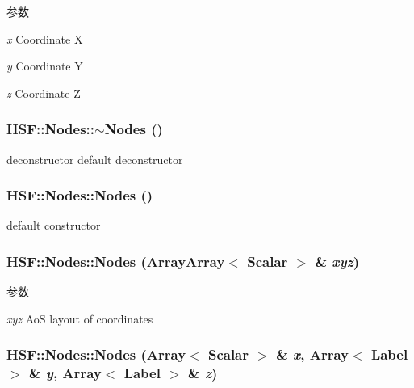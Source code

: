 \begin{DoxyParams}{参数}
\item[{\em x}]Coordinate X \item[{\em y}]Coordinate Y \item[{\em z}]Coordinate Z \end{DoxyParams}
\hypertarget{classHSF_1_1Nodes_aad6cecbfe88532697dedfca221638d89}{
\subsubsection[{$\sim$Nodes}]{\setlength{\rightskip}{0pt plus 5cm}HSF::Nodes::$\sim$Nodes ()}}
\label{classHSF_1_1Nodes_aad6cecbfe88532697dedfca221638d89}


deconstructor default deconstructor \hypertarget{classHSF_1_1Nodes_a4cf0a36ef0cbd1d2183e6f426289b3ef}{
\subsubsection[{Nodes}]{\setlength{\rightskip}{0pt plus 5cm}HSF::Nodes::Nodes ()}}
\label{classHSF_1_1Nodes_a4cf0a36ef0cbd1d2183e6f426289b3ef}


default constructor \hypertarget{classHSF_1_1Nodes_a6c4e1453888f5fa3008d992d1f19c1b4}{
\subsubsection[{Nodes}]{\setlength{\rightskip}{0pt plus 5cm}HSF::Nodes::Nodes ({\bf ArrayArray}$<$ {\bf Scalar} $>$ \& {\em xyz})}}
\label{classHSF_1_1Nodes_a6c4e1453888f5fa3008d992d1f19c1b4}

\begin{DoxyParams}{参数}
\item[{\em xyz}]AoS layout of coordinates \end{DoxyParams}
\hypertarget{classHSF_1_1Nodes_aa08a28dcddd6fdbc64fef3d3c7bfba82}{
\subsubsection[{Nodes}]{\setlength{\rightskip}{0pt plus 5cm}HSF::Nodes::Nodes (Array$<$ {\bf Scalar} $>$ \& {\em x}, \/  Array$<$ {\bf Label} $>$ \& {\em y}, \/  Array$<$ {\bf Label} $>$ \& {\em z})}}
\label{classHSF_1_1Nodes_aa08a28dcddd6fdbc64fef3d3c7bfba82}

